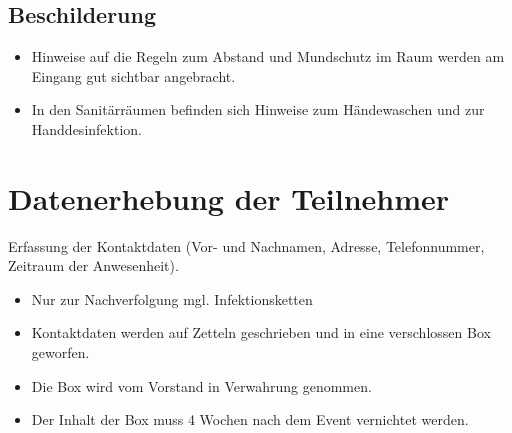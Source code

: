 \documentclass[10pt,a4paper]{scrartcl}
\begin{document}
\subsection{Beschilderung}
\begin{itemize}
\item Hinweise auf die Regeln zum Abstand und Mundschutz im Raum werden am Eingang gut sichtbar angebracht.
\item In den Sanitärräumen befinden sich Hinweise zum Händewaschen und zur Handdesinfektion.
\end{itemize}


\section{Datenerhebung der Teilnehmer}
Erfassung der Kontaktdaten (Vor- und Nachnamen, Adresse, Telefonnummer, Zeitraum der Anwesenheit).
\begin{itemize}
  \item Nur zur Nachverfolgung mgl. Infektionsketten
  \item Kontaktdaten werden auf Zetteln geschrieben und in eine verschlossen Box geworfen.
  \item Die Box wird vom Vorstand in Verwahrung genommen.
  \item Der Inhalt der Box muss 4 Wochen nach dem Event vernichtet werden.
\end{itemize}
\end{document}
